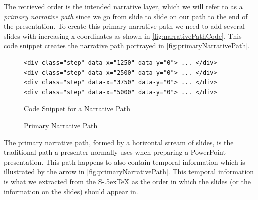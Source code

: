 \documentclass[twoside, 12pt]{article}
\def\stex{\texorpdfstring{\raisebox{-.5ex}S\kern-.5ex\TeX}{sTeX}\xspace}
\begin{document}
The retrieved order is the intended narrative layer, which we will refer to as a \textit{primary narrative path} since we go from slide to slide on our path to the end of the presentation. To create this primary narrative path we need to add several slides with increasing x-coordinates as shown in \autoref{fig:narrativePathCode}. This code snippet creates the narrative path portrayed in \autoref{fig:primaryNarrativePath}.\\

\begin{figure}
\vspace{-26pt}
\begin{verbatim}
<div class="step" data-x="1250" data-y="0"> ... </div>
<div class="step" data-x="2500" data-y="0"> ... </div>
<div class="step" data-x="3750" data-y="0"> ... </div>
<div class="step" data-x="5000" data-y="0"> ... </div>
\end{verbatim}
\vspace{-5pt}
  \caption{Code Snippet for a Narrative Path}
  \label{fig:narrativePathCode}
  \vspace{12pt}
\end{figure}

\begin{figure}
\vspace{-20pt}
  \begin{center}
  \end{center}
\vspace{-16pt}
  \caption{Primary Narrative Path}
  \label{fig:primaryNarrativePath}
\vspace{12pt}
\end{figure}

\begin{figure}
\vspace{-50pt}
\end{figure}

The primary narrative path, formed by a horizontal stream of slides, is the traditional path a presenter normally uses when preparing a PowerPoint presentation. This path happens to also contain temporal information which is illustrated by the arrow in \autoref{fig:primaryNarrativePath}. This temporal information is what we extracted from the \stex as the order in which the slides (or the information on the slides) should appear in.\\
\end{document}
